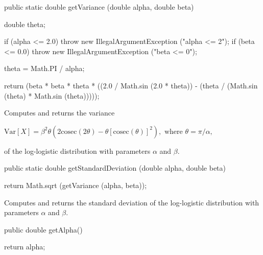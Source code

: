 \begin{code}

   public static double getVariance (double alpha, double beta)\begin{hide} {
      double theta;

      if (alpha <= 2.0)
         throw new IllegalArgumentException ("alpha <= 2");
      if (beta <= 0.0)
         throw new IllegalArgumentException ("beta <= 0");

      theta = Math.PI / alpha;

      return (beta * beta * theta * ((2.0 / Math.sin (2.0 * theta)) -
                   (theta / (Math.sin (theta) * Math.sin (theta)))));
   }\end{hide}
\end{code}
\begin{tabb}  Computes and returns the variance
\begin{latexonly}
   $\mbox{Var}[X] = \beta^2 \theta (2 \mbox{cosec}(2 \theta) -
   \theta[\mbox{cosec}(\theta)]^2), \mbox{ where } \theta = {\pi/\alpha},$
\end{latexonly}
   of the log-logistic distribution with parameters $\alpha$ and $\beta$.
\end{tabb}
\begin{htmlonly}
\end{htmlonly}
\begin{code}

   public static double getStandardDeviation (double alpha, double beta)\begin{hide} {
      return Math.sqrt (getVariance (alpha, beta));
   }\end{hide}
\end{code}
\begin{tabb}  Computes and returns the standard deviation of the log-logistic
   distribution with parameters $\alpha$ and $\beta$.
\end{tabb}
\begin{htmlonly}
\end{htmlonly}
\begin{code}

   public double getAlpha()\begin{hide} {
      return alpha;
   }\end{hide}
\end{code}
